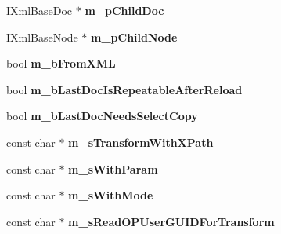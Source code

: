 \begin{DoxyCompactItemize}
\item 
\hypertarget{classgeneral__server_1_1TXml_a8806558865e3263acb2614cd1fc18761}{\-I\-Xml\-Base\-Doc $\ast$ {\bfseries m\-\_\-p\-Child\-Doc}}\label{classgeneral__server_1_1TXml_a8806558865e3263acb2614cd1fc18761}

\item 
\hypertarget{classgeneral__server_1_1TXml_aaff9648fd365ff2dd5cf6ed5b930e4cc}{\-I\-Xml\-Base\-Node $\ast$ {\bfseries m\-\_\-p\-Child\-Node}}\label{classgeneral__server_1_1TXml_aaff9648fd365ff2dd5cf6ed5b930e4cc}

\item 
\hypertarget{classgeneral__server_1_1TXml_a8a4817524d7a42bbe4902259f0743ecb}{bool {\bfseries m\-\_\-b\-From\-X\-M\-L}}\label{classgeneral__server_1_1TXml_a8a4817524d7a42bbe4902259f0743ecb}

\item 
\hypertarget{classgeneral__server_1_1TXml_a8e66cac9535fee7a98362ab88316f825}{bool {\bfseries m\-\_\-b\-Last\-Doc\-Is\-Repeatable\-After\-Reload}}\label{classgeneral__server_1_1TXml_a8e66cac9535fee7a98362ab88316f825}

\item 
\hypertarget{classgeneral__server_1_1TXml_a61a0d061b8b9ce621a3e31b3a9661308}{bool {\bfseries m\-\_\-b\-Last\-Doc\-Needs\-Select\-Copy}}\label{classgeneral__server_1_1TXml_a61a0d061b8b9ce621a3e31b3a9661308}

\item 
\hypertarget{classgeneral__server_1_1TXml_a18a67697d61b69ba6c3c029c4295f867}{const char $\ast$ {\bfseries m\-\_\-s\-Transform\-With\-X\-Path}}\label{classgeneral__server_1_1TXml_a18a67697d61b69ba6c3c029c4295f867}

\item 
\hypertarget{classgeneral__server_1_1TXml_a2bba9e24e7f1edc5f13c65b4987e6f50}{const char $\ast$ {\bfseries m\-\_\-s\-With\-Param}}\label{classgeneral__server_1_1TXml_a2bba9e24e7f1edc5f13c65b4987e6f50}

\item 
\hypertarget{classgeneral__server_1_1TXml_a2aada165b29c504273dd6e00d7c784f2}{const char $\ast$ {\bfseries m\-\_\-s\-With\-Mode}}\label{classgeneral__server_1_1TXml_a2aada165b29c504273dd6e00d7c784f2}

\item 
\hypertarget{classgeneral__server_1_1TXml_a191be73f9c45b6c67877a49d05c3f049}{const char $\ast$ {\bfseries m\-\_\-s\-Read\-O\-P\-User\-G\-U\-I\-D\-For\-Transform}}\label{classgeneral__server_1_1TXml_a191be73f9c45b6c67877a49d05c3f049}


\end{DoxyCompactItemize}
